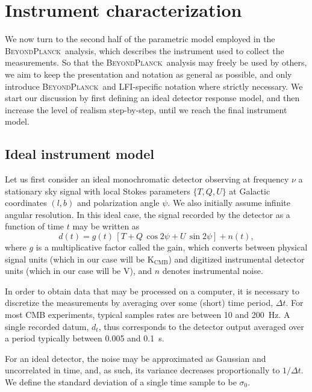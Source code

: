 \documentclass[twocolumn]{aa}
\newcommand{\BP}{\textsc{BeyondPlanck}}
\begin{document}
\section{Instrument characterization}
\label{sec:instrument}

We now turn to the second half of the parametric model
employed in the \BP\ analysis, which describes the instrument used to
collect the measurements. So that the \BP\ analysis may freely be used by
others, we aim to
keep the presentation and notation as general as possible, and only
introduce \BP\ and LFI-specific notation where strictly necessary. We
start our discussion by first defining an ideal detector response
model, and then increase the level of realism step-by-step, until we
reach the final instrument model.

\subsection{Ideal instrument model}
\label{sec:ideal_model}

Let us first consider an ideal monochromatic detector observing at
frequency $\nu$ a stationary sky signal with local Stokes parameters
$\{T,Q,U\}$ at Galactic coordinates $(l,b)$ and polarization angle
$\psi$.  We also initially assume infinite angular resolution. In this 
ideal case, the signal recorded by the detector as a function of time $t$ 
may be written as
\begin{equation}
  d(t) = g(t)\,\left[T + Q\,\cos2\psi + U\,\sin2\psi\right]
  + n(t),
  \label{eq:ideal_model}
\end{equation}
where $g$ is a multiplicative factor called the gain, which converts
between physical signal units (which in our case will be
$\mathrm{K}_{\mathrm{CMB}}$) and digitized instrumental detector units
(which in our case will be V), and $n$ denotes instrumental
noise.

In order to obtain data that may be processed on a computer, it is
necessary to discretize the measurements by averaging over some
(short) time period, $\Delta t$. For most CMB experiments, typical
samples rates are between 10 and 200~Hz. A single recorded datum,
$d_t$, thus corresponds to the detector output averaged over a period 
typically between 0.005 and 0.1~s.

For an ideal detector, the noise may be approximated as Gaussian and
uncorrelated in time, and, as such, its variance decreases
proportionally to $1/\Delta t$. We define the standard deviation of a
single time sample to be $\sigma_0$.
\end{document}
